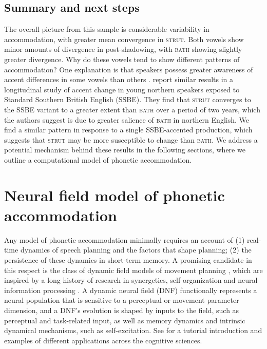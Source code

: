 \documentclass[10pt,letterpaper]{article}
\begin{document}
\subsection{Summary and next steps}

The overall picture from this sample is considerable variability in accommodation, with greater mean convergence in \textsc{strut}. Both vowels show minor amounts of divergence in post-shadowing, with \textsc{bath} showing slightly greater divergence. Why do these vowels tend to show different patterns of accommodation? One explanation is that speakers possess greater awareness of accent differences in some vowels than others \citep{babel2010}. \citet{evans-iverson2007} report similar results in a longitudinal study of accent change in young northern speakers exposed to Standard Southern British English (SSBE). They find that \textsc{strut} converges to the SSBE variant to a greater extent than \textsc{bath} over a period of two years, which the authors suggest is due to greater salience of \textsc{bath} in northern English. We find a similar pattern in response to a single SSBE-accented production, which suggests that \textsc{strut} may be more susceptible to change than \textsc{bath}. We address a potential mechanism behind these results in the following sections, where we outline a computational model of phonetic accommodation.


\section{Neural field model of phonetic accommodation}
\label{sec:model}

Any model of phonetic accommodation minimally requires an account of (1) real-time dynamics of speech planning and the factors that shape planning; (2) the persistence of these dynamics in short-term memory. A promising candidate in this respect is the class of dynamic field models of movement planning \citep{erlhagen-schoener2002}, which are inspired by a long history of research in synergetics, self-organization and neural information processing \citep[e.g.][]{grossberg1980, haken1977, kelso1995}. A dynamic neural field (DNF) functionally represents a neural population that is sensitive to a perceptual or movement parameter dimension, and a DNF's evolution is shaped by inputs to the field, such as perceptual and task-related input, as well as memory dynamics and intrinsic dynamical mechanisms, such as self-excitation. See \citet{schoener-etal2016} for a tutorial introduction and examples of different applications across the cognitive sciences.
\end{document}
